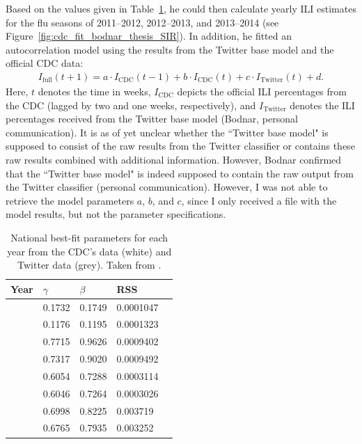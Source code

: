 \documentclass[11pt, a4paper,twoside]{report}\usepackage[]{graphicx}\usepackage[]{color}
\begin{document}
Based on the values given in Table~\ref{tab:nationalparams}, he could then calculate yearly ILI estimates for the flu seasons of 2011--2012, 2012--2013, and 2013--2014 (see Figure~\ref{fig:cdc_fit_bodnar_thesis_SIR}). In addition, he fitted an autocorrelation model using the results from the Twitter base model and the official CDC data: 
  \begin{align}
I_{\text{full}}(t + 1) = a \cdot I_{\text{CDC}}(t - 1) + b \cdot I_{\text{CDC}}(t) + c \cdot I_{\text{Twitter}}(t) + d. \label{eq:2}
  \end{align}
Here, $t$ denotes the time in weeks, $I_{\text{CDC}}$ depicts the official ILI percentages from the CDC (lagged by two and one weeks, respectively), and $I_{\text{Twitter}}$ denotes the ILI percentages received from the Twitter base model (Bodnar, personal communication). It is as of yet unclear whether the ``Twitter base model" is supposed to consist of the raw results from the Twitter classifier or contains these raw results combined with additional information. However, Bodnar confirmed that the ``Twitter base model" is indeed supposed to contain the raw output from the Twitter classifier (personal communication). However, I was not able to retrieve the model parameters $a$, $b$, and $c$, since I only received a file with the model results, but not the parameter specifications.
\begin{table}[htbp!]
\centering
\caption{National best-fit parameters for each year from the CDC's data (white) and Twitter data (grey). Taken from \cite{bodnar_data_2015}.}
\begin{tabular}{l l l l l}

 Year & \(\gamma\) & \(\beta\) & RSS\\ \hline
& 0.1732 & 0.1749  & 0.0001047   \\ 
 {\multirow{-2}{*}{ 2011-2012 }}  & \cellcolor{grey}0.1176  & \cellcolor{grey}0.1195  & \cellcolor{grey}0.0001323  \\ \cline{2-4}
  {\multirow{2}{*}{ 2012-2013 }}& 0.7715 & 0.9626 & 0.0009402   \\ 
   & \cellcolor{grey}0.7317  & \cellcolor{grey}0.9020 & \cellcolor{grey}0.0009492   \\ \cline{2-4}
  {\multirow{2}{*}{ 2013-2014 }}& 0.6054 & 0.7288   & 0.0003114   \\ 
   & \cellcolor{grey}0.6046 & \cellcolor{grey}0.7264 & \cellcolor{grey}0.0003026  \\ \cline{2-4}
  {\multirow{2}{*}{ Combined }}& 0.6998 & 0.8225  & 0.003719   \\ 
   & \cellcolor{grey}0.6765  & \cellcolor{grey}0.7935  & \cellcolor{grey}0.003252   \\ 
\end{tabular}
\label{tab:nationalparams}
\end{table}
\end{document}

